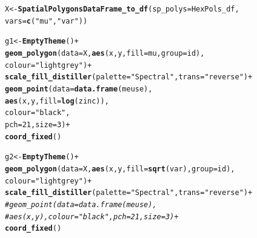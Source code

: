 \documentclass{article}\usepackage[]{graphicx}\usepackage[]{color}
\makeatletter
\newcommand{\hlnum}[1]{\textcolor[rgb]{0.686,0.059,0.569}{#1}}%
\newcommand{\hlstr}[1]{\textcolor[rgb]{0.192,0.494,0.8}{#1}}%
\newcommand{\hlcom}[1]{\textcolor[rgb]{0.678,0.584,0.686}{\textit{#1}}}%
\newcommand{\hlopt}[1]{\textcolor[rgb]{0,0,0}{#1}}%
\newcommand{\hlstd}[1]{\textcolor[rgb]{0.345,0.345,0.345}{#1}}%
\newcommand{\hlkwb}[1]{\textcolor[rgb]{0.69,0.353,0.396}{#1}}%
\newcommand{\hlkwc}[1]{\textcolor[rgb]{0.333,0.667,0.333}{#1}}%
\newcommand{\hlkwd}[1]{\textcolor[rgb]{0.737,0.353,0.396}{\textbf{#1}}}%
\newenvironment{kframe}{%
 \def\at@end@of@kframe{}%
 \ifinner\ifhmode%
  \def\at@end@of@kframe{\end{minipage}}%
  \begin{minipage}{\columnwidth}%
 \fi\fi%
 \def\FrameCommand##1{\hskip\@totalleftmargin \hskip-\fboxsep
 \colorbox{shadecolor}{##1}\hskip-\fboxsep
     \hskip-\linewidth \hskip-\@totalleftmargin \hskip\columnwidth}%
 \MakeFramed {\advance\hsize-\width
   \@totalleftmargin\z@ \linewidth\hsize
   \@setminipage}}%
 {\par\unskip\endMakeFramed%
 \at@end@of@kframe}
\newenvironment{knitrout}{}{} %
\makeatother
\begin{document}
\begin{knitrout}
\begin{kframe}
{\ttfamily\noindent{}}\begin{alltt}
\hlstd{X} \hlkwb{<-} \hlkwd{SpatialPolygonsDataFrame_to_df}\hlstd{(}\hlkwc{sp_polys} \hlstd{= HexPols_df,}
                                    \hlkwc{vars} \hlstd{=} \hlkwd{c}\hlstd{(}\hlstr{"mu"}\hlstd{,}\hlstr{"var"}\hlstd{))}
\end{alltt}


{\ttfamily\noindent\itshape{}}\begin{alltt}
\hlstd{g1} \hlkwb{<-} \hlkwd{EmptyTheme}\hlstd{()} \hlopt{+}
    \hlkwd{geom_polygon}\hlstd{(}\hlkwc{data}\hlstd{=X,}\hlkwd{aes}\hlstd{(x,y,}\hlkwc{fill}\hlstd{=mu,}\hlkwc{group}\hlstd{=id),}
                 \hlkwc{colour}\hlstd{=}\hlstr{"light grey"}\hlstd{)} \hlopt{+}
    \hlkwd{scale_fill_distiller}\hlstd{(}\hlkwc{palette}\hlstd{=}\hlstr{"Spectral"}\hlstd{,}\hlkwc{trans}\hlstd{=}\hlstr{"reverse"}\hlstd{)} \hlopt{+}
    \hlkwd{geom_point}\hlstd{(}\hlkwc{data}\hlstd{=}\hlkwd{data.frame}\hlstd{(meuse),}
               \hlkwd{aes}\hlstd{(x,y,}\hlkwc{fill}\hlstd{=}\hlkwd{log}\hlstd{(zinc)),}
               \hlkwc{colour}\hlstd{=}\hlstr{"black"}\hlstd{,}
               \hlkwc{pch}\hlstd{=}\hlnum{21}\hlstd{,} \hlkwc{size}\hlstd{=}\hlnum{3}\hlstd{)} \hlopt{+}
    \hlkwd{coord_fixed}\hlstd{()}

\hlstd{g2} \hlkwb{<-} \hlkwd{EmptyTheme}\hlstd{()} \hlopt{+}
    \hlkwd{geom_polygon}\hlstd{(}\hlkwc{data}\hlstd{=X,}\hlkwd{aes}\hlstd{(x,y,}\hlkwc{fill}\hlstd{=}\hlkwd{sqrt}\hlstd{(var),}\hlkwc{group}\hlstd{=id),}
                 \hlkwc{colour}\hlstd{=}\hlstr{"light grey"}\hlstd{)} \hlopt{+}
    \hlkwd{scale_fill_distiller}\hlstd{(}\hlkwc{palette}\hlstd{=}\hlstr{"Spectral"}\hlstd{,}\hlkwc{trans}\hlstd{=}\hlstr{"reverse"}\hlstd{)} \hlopt{+}
    \hlcom{#geom_point(data=data.frame(meuse),}
    \hlcom{#           aes(x,y),colour="black",pch=21, size=3) +}
    \hlkwd{coord_fixed}\hlstd{()}


\end{alltt}
\end{kframe}
\end{knitrout}
\end{document}
